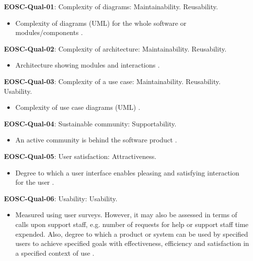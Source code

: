\textbf{EOSC-Qual-01}: Complexity of diagrams: Maintainability. Reusability.

\begin{itemize}
    \item Complexity of diagrams (UML) for the whole software or modules/components \cite{montagud_systematic_2012}.
\end{itemize}

\textbf{EOSC-Qual-02}: Complexity of architecture: Maintainability. Reusability.

\begin{itemize}
    \item Architecture showing modules and interactions \cite{montagud_systematic_2012,zuser_software_2005}.
\end{itemize}

\textbf{EOSC-Qual-03}: Complexity of a use case: Maintainability. Reusability. Usability.

\begin{itemize}
    \item Complexity of use case diagrams (UML) \cite{montagud_systematic_2012}.
\end{itemize}

\textbf{EOSC-Qual-04}: Sustainable community: Supportability.

\begin{itemize}
    \item An active community is behind the software product \cite{aberdour_achieving_2007}.
\end{itemize}

\textbf{EOSC-Qual-05}: User satisfaction: Attractiveness.

\begin{itemize}
    \item Degree to which a user interface enables pleasing and satisfying interaction for the user \cite{iso_25010_2011_2017,zuser_software_2005}.
\end{itemize}

\textbf{EOSC-Qual-06}: Usability: Usability.

\begin{itemize}
    \item Measured using user surveys. However, it may also be assessed in terms of calls upon support staff, e.g. number of requests for help or support staff time expended. Also, degree to which a product or system can be used by specified users to achieve specified goals with effectiveness, efficiency and satisfaction in a specified context of use \cite{iso_25010_2011_2017,zuser_software_2005,gillies_modelling_1992,boehm_quantitative_1976}.
\end{itemize}

